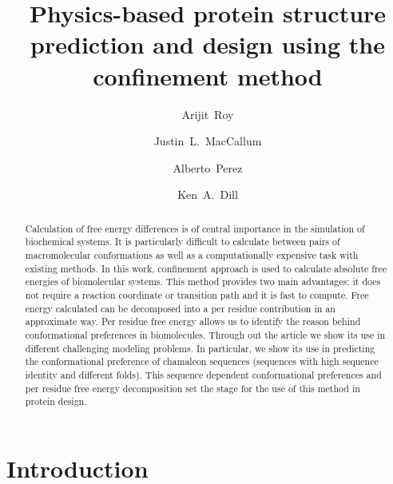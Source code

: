 \documentclass[12pt]{article}
\author{Arijit~Roy}
\author{Justin~L.~MacCallum}
\author{Alberto~Perez}
\author{Ken~A.~Dill}
\affil{Laufer Center for Physical and Quantitative Biology\\
    Stony Brook University\\
    Stony Brook, NY 11794-5252.}
\title{Physics-based protein structure prediction and design using the confinement method}
\begin{document}
\maketitle

\begin{abstract}

Calculation of free energy differences is of central importance in the simulation of biochemical
systems. It is particularly difficult to calculate between pairs of macromolecular
conformations as well as a computationally expensive task with existing
methods. In this work, confinement approach is used to calculate absolute
free energies of biomolecular systems. This method provides two main advantages: it does not require a reaction coordinate or
transition path and it is fast to compute. Free energy calculated can be decomposed into a per
residue contribution in an 
approximate way. Per residue free energy allows us
to identify the reason behind conformational preferences in biomolecules. Through out the article we show its use in different
challenging modeling problems. In particular, we show its use in predicting the conformational
preference of chamaleon sequences (sequences with high sequence identity and different
folds). This sequence dependent conformational preferences and per residue free energy decomposition set the stage for the use of this 
method in protein design. 

\end{abstract}


\section{Introduction}
\end{document}
